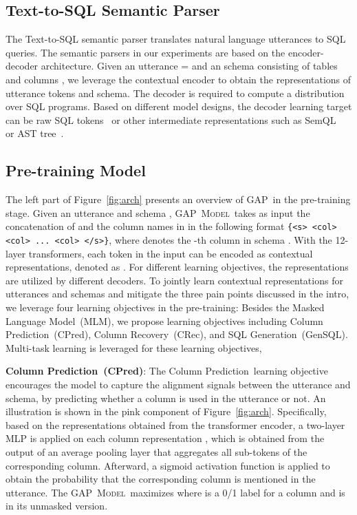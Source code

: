 \documentclass[letterpaper]{article} \usepackage{aaai21}  \usepackage{times}  \usepackage{helvet} \usepackage{courier}  \usepackage[hyphens]{url}  \usepackage{graphicx} \usepackage{booktabs}
\newcommand{\modelname}{\textsc{GAP~}}
\newcommand{\modelnamelm}{\textsc{GAP~Model}}
\newcommand{\colpred}{CPred}
\newcommand{\fullcolpred}{Column Prediction~}
\newcommand{\colrec}{CRec}
\newcommand{\gensql}{GenSQL}
\begin{document}
\subsection{Text-to-SQL Semantic Parser}

The Text-to-SQL semantic parser translates natural language utterances to SQL queries.
The semantic parsers in our experiments are based on the encoder-decoder architecture.
Given an utterance  =  and an schema  consisting of tables  and columns , we leverage the contextual encoder to obtain the representations of utterance tokens and schema.
The decoder is required to compute a distribution  over SQL programs.
Based on different model designs, the decoder learning target  can be raw SQL tokens~\cite{zhang19} or other intermediate representations such as SemQL~\cite{guo2019towards} or AST tree~\cite{bogin2019representing,yin2020tabert}.

\subsection{Pre-training Model}

The left part of Figure~\ref{fig:arch} presents an overview of \modelname in the pre-training stage.
Given an utterance  and schema , \modelnamelm~takes as input the concatenation of  and the column names  in  in the following format  \texttt{\{<s>  <col>  <col>  ... <col>  </s>\}},
where  denotes the -th column in schema .
With the 12-layer transformers, each token in the input can be encoded as contextual representations, denoted as .
For different learning objectives, the representations are utilized by different decoders.
To jointly learn contextual representations for utterances and schemas and mitigate the three pain points discussed in the intro, we leverage four learning objectives in the pre-training:
Besides the Masked Language Model~(MLM), we propose learning objectives including Column Prediction~(\colpred), Column Recovery~(\colrec), and SQL Generation~(\gensql).
Multi-task learning is leveraged for these learning objectives,

\smallskip \noindent \textbf{\fullcolpred(\colpred)}:
The \fullcolpred learning objective encourages the model to capture the alignment signals between the utterance and schema, by predicting whether a column is used in the utterance or not.
An illustration is shown in the pink component of Figure~\ref{fig:arch}.
Specifically, based on the representations obtained from the transformer encoder, 
a two-layer MLP is applied on each column representation , which is obtained from the output of an average pooling layer that aggregates all sub-tokens of the corresponding column.
Afterward, a sigmoid activation function is applied to obtain the probability that the corresponding column is mentioned in the utterance.
The \modelnamelm~maximizes  where  is a 0/1 label for a column and  is in its unmasked version.
\end{document}
